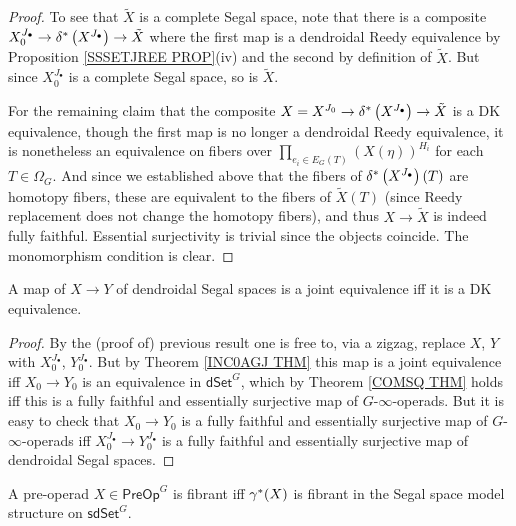 \documentclass[a4paper,10pt,draft]{article}%
\numberwithin{equation}{section}%
\numberwithin{figure}{section}
\begin{document}
\begin{proof}
To see that $\tilde{X}$ is a complete Segal space, note that there is a composite
$X_0^{J_{\bullet}} \to 
\delta^{\**}\left( X^{J_{\bullet}} \right)
\to \tilde{X}$
where the first map is a dendroidal Reedy equivalence by Proposition \ref{SSSETJREE PROP}(iv)
and the second by definition of $\tilde{X}$.
But since $X_0^{J_{\bullet}}$ is a complete Segal space, so is 
$\tilde{X}$.

For the remaining claim that the composite
$X = X^{J_{0}} \to 
\delta^{\**}\left( X^{J_{\bullet}} \right)
\to \tilde{X}$
is a DK equivalence, 
though the first map is no longer a dendroidal Reedy equivalence, 
it is nonetheless an equivalence
on fibers over
$\prod_{e_i \in E_G(T)} \left(X(\eta)\right)^{H_i}$
for each $T\in \Omega_G$.
And since we established above that the fibers of
$\delta^{\**}\left( X^{J_{\bullet}} \right)(T)$
 are homotopy fibers, these are equivalent to the fibers of $\tilde{X}(T)$ (since Reedy replacement does not change the homotopy fibers), and thus $X \to \tilde{X}$ is indeed fully faithful.
Essential surjectivity is trivial since the objects coincide.
The monomorphism condition is clear.
\end{proof}


\begin{corollary}
	A map of $X \to Y$ of dendroidal Segal spaces is a joint equivalence iff it is a DK equivalence.
\end{corollary}


\begin{proof}
By the (proof of) previous result one is free to, via a zigzag, 
replace $X$, $Y$ with 
$X_0^{J_{\bullet}}$, $Y_0^{J_{\bullet}}$.
But by Theorem \ref{INC0AGJ THM} this map is a joint equivalence iff
$X_0 \to Y_0$ is an equivalence in $\mathsf{dSet}^G$, which by 
Theorem \ref{COMSQ THM} holds iff this is a fully faithful and essentially surjective map of $G$-$\infty$-operads.
But it is easy to check that
$X_0 \to Y_0$ is a fully faithful and essentially surjective map of $G$-$\infty$-operads iff
$X_0^{J_{\bullet}}\to Y_0^{J_{\bullet}}$
is a fully faithful and essentially surjective map
of dendroidal Segal spaces.
\end{proof}


\begin{corollary}
	A pre-operad $X \in \mathsf{PreOp}^G$ is fibrant iff $\gamma^{\**}(X)$ is fibrant in the Segal space model structure on 
	$\mathsf{sdSet}^G$.
\end{corollary}
\end{document}
